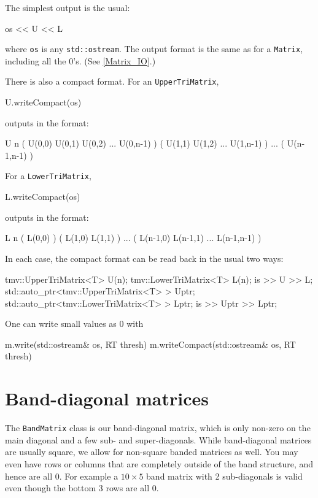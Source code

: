 \documentclass[twoside,letterpaper,11pt]{article}
\renewcommand{\tt}[1]{{\lstinline {#1}}}
\begin{document}
The simplest output is the usual:
\begin{tmvcode}
os << U << L
\end{tmvcode}
where \tt{os} is any \tt{std::ostream}.
The output format is the same as for a \tt{Matrix}, including all the 0's.
(See \ref{Matrix_IO}.)

There is also a compact format.  For an \tt{UpperTriMatrix},
\begin{tmvcode}
U.writeCompact(os)
\end{tmvcode}
outputs in the format:
\begin{tmvcode}
U n 
( U(0,0)  U(0,1)  U(0,2)  ...  U(0,n-1) )
( U(1,1)  U(1,2)  ...  U(1,n-1) )
...
( U(n-1,n-1) )
\end{tmvcode}
For a \tt{LowerTriMatrix},
\begin{tmvcode}
L.writeCompact(os)
\end{tmvcode}
outputs in the format:
\begin{tmvcode}
L n 
( L(0,0) )
( L(1,0)  L(1,1) )
...
( L(n-1,0)  L(n-1,1) ... L(n-1,n-1) )
\end{tmvcode}

In each case, the compact format can be read back in the usual two ways:
\begin{tmvcode}
tmv::UpperTriMatrix<T> U(n);
tmv::LowerTriMatrix<T> L(n);
is >> U >> L;
std::auto_ptr<tmv::UpperTriMatrix<T> > Uptr;
std::auto_ptr<tmv::LowerTriMatrix<T> > Lptr;
is >> Uptr >> Lptr;
\end{tmvcode}

One can write small values as 0 with
\begin{tmvcode}
m.write(std::ostream& os, RT thresh)
m.writeCompact(std::ostream& os, RT thresh)
\end{tmvcode}

\newpage
\section{Band-diagonal matrices}
\label{BandMatrix}

The \tt{BandMatrix} class is our band-diagonal matrix, which is only non-zero
on the main diagonal and a few sub- and super-diagonals.  While band-diagonal
matrices are usually square, we allow for non-square banded matrices as well.
You may even have rows or columns that are completely outside of the 
band structure, and hence are all 0.  For example a $10\times 5$ band matrix
with 2 sub-diagonals is valid even though the bottom 3 rows are all 0.
\end{document}
